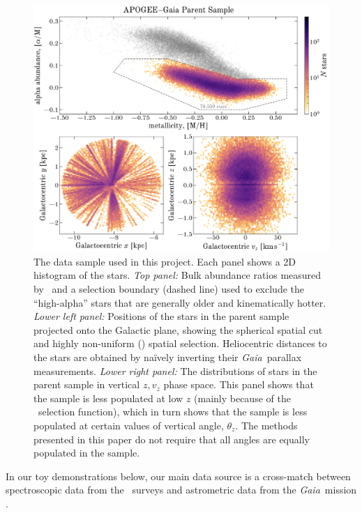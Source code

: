 \documentclass[modern]{aastex63}
\newcommand{\gaia}{\textsl{Gaia}}
\newcommand{\apogee}{\acronym{APOGEE}}
\begin{document}
\begin{figure}[!tp]
  \begin{center}
  \includegraphics[width=\textwidth]{mh-am-xy.pdf}
  \end{center}
  \caption{%
    The data sample used in this project.
    Each panel shows a 2D histogram of the stars.
    \textsl{Top panel:}
    Bulk abundance ratios measured by \apogee\ and a selection boundary (dashed
    line) used to exclude the ``high-alpha'' stars that are generally older and
    kinematically hotter.
    \textsl{Lower left panel:}
    Positions of the stars in the parent sample projected onto the Galactic
    plane, showing the spherical spatial cut and highly non-uniform (\apogee)
    spatial selection.
    Heliocentric distances to the stars are obtained by na\"ively inverting
    their \gaia\ parallax measurements.
    \textsl{Lower right panel:}
    The distributions of stars in the parent sample in vertical $z, v_z$ phase
    space.
    This panel shows that the sample is less populated at low $z$ (mainly
    because of the \apogee\ selection function), which in turn shows that the
    sample is less populated at certain values of vertical angle, $\theta_z$.
    The methods presented in this paper do not require that all angles are
    equally populated in the sample.
    \label{fig:mh-am-xy}
    }
\end{figure}

In our toy demonstrations below, our main data source is a cross-match between
spectroscopic data from the \apogee\ surveys \citep{Majewski:2017} and
astrometric data from the \gaia\ mission \citep{Gaia-Collaboration:2016,
Gaia-Collaboration:2018}.
\end{document}
